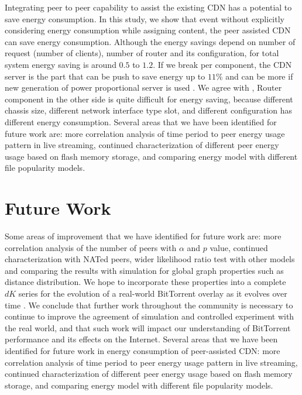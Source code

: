 Integrating peer to peer capability to assist the existing CDN has a potential to save energy consumption.
In this study, we show that event without explicitly considering energy consumption while assigning content, the peer assisted CDN can save energy consumption.
Although the energy savings depend on number of request (number of clients), number of router and its configuration, for total system energy saving is around $0.5$ to $1.2$.
If we break per component, the CDN server is the part that can be push to save energy up to $11\%$ and can be more if new generation of power proportional server is used \cite{Krioukov:2011:NDI:1925861.1925878}.
We agree with \cite{4509688}, Router component in the other side is quite difficult for energy saving, because different chassis size, different network interface type slot, and different configuration has different energy consumption.
Several areas that we have been identified for future work are: more correlation analysis of time period to peer energy usage pattern in live streaming, continued characterization of different peer energy usage based on flash memory storage, and comparing energy model with different file popularity models.


\section{Future Work}
Some areas of improvement that we have identified for future work are: more correlation analysis of the number of peers with $\alpha$ and $p$ value, continued characterization with NATed peers, wider likelihood ratio test with other models and comparing the results with simulation for global graph properties such as distance distribution.
We hope to incorporate these properties into a complete $dK$ series for the evolution of a real-world BitTorrent overlay as it evolves over time \cite{mahadevan2006systematic}. 
We conclude that further work throughout the community is necessary to continue to improve the agreement of simulation and controlled experiment with the real world, and that such work will impact our understanding of BitTorrent performance and its effects on the Internet.
Several areas that we have been identified for future work in energy consumption of peer-assisted CDN: more correlation analysis of time period to peer energy usage pattern in live streaming, continued characterization of different peer energy usage based on flash memory storage, and comparing energy model with different file popularity models.